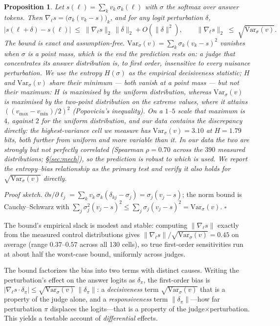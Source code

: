 \documentclass[11pt]{article}
\newtheorem{proposition}{Proposition}
\begin{document}
\begin{proposition}\label{prop:main}
Let $s(\ell)=\sum_k v_k\,\sigma_k(\ell)$ with $\sigma$ the softmax over answer tokens.
Then $\nabla_\ell s = \big(\sigma_k(v_k-s)\big)_k$, and for any logit perturbation
$\delta$,
\[
|s(\ell+\delta)-s(\ell)| \;\le\; \|\nabla_\ell s\|_2\,\|\delta\|_2 + O(\|\delta\|^2),
\qquad
\|\nabla_\ell s\|_2 \;\le\; \sqrt{\mathrm{Var}_\sigma(v)} .
\]
The bound is exact and assumption-free. $\mathrm{Var}_\sigma(v)=\sum_k\sigma_k(v_k-s)^2$
vanishes when $\sigma$ is a point mass, which is the end the prediction rests on: a judge
that concentrates its answer distribution is, to first order, insensitive to \emph{every}
nuisance perturbation. We use the entropy $H(\sigma)$ as the empirical decisiveness
statistic; $H$ and $\mathrm{Var}_\sigma(v)$ share their minimum --- both vanish at a point
mass --- but not their maximum: $H$ is maximised by the uniform distribution, whereas
$\mathrm{Var}_\sigma(v)$ is maximised by the two-point distribution on the extreme
values, where it attains $((v_{\max}-v_{\min})/2)^2$ (Popoviciu's inequality). On a
$1$--$5$ scale that maximum is $4$, against $2$ for the uniform distribution, and our
data contains the discrepancy directly: the highest-variance cell we measure has
$\mathrm{Var}_\sigma(v)=3.10$ at $H=1.79$ bits, both further from uniform and more
variable than it. In our data the two are
strongly but not perfectly correlated (Spearman $\rho=0.70$ across the
$390$ measured distributions; \S\ref{sec:mech}), so the prediction is robust to
which is used. We
report the entropy--bias relationship as the primary test and verify it also holds for
$\sqrt{\mathrm{Var}_\sigma(v)}$ directly.
\end{proposition}

\noindent\emph{Proof sketch.} $\partial s/\partial \ell_j=\sum_k v_k\,\sigma_k(\delta_{kj}-\sigma_j)
=\sigma_j(v_j-s)$; the norm bound is Cauchy--Schwarz with
$\sum_j\sigma_j^2(v_j-s)^2\le\sum_j\sigma_j(v_j-s)^2=\mathrm{Var}_\sigma(v)$. $\square$

\smallskip
\noindent The bound's empirical slack is modest and stable: computing
$\|\nabla_\ell s\|$ exactly from the measured control distributions gives
$\|\nabla_\ell s\|/\sqrt{\mathrm{Var}_\sigma(v)} = 0.45$ on average (range
$0.37$--$0.57$ across all 130 cells), so true first-order sensitivities run at about
half the worst-case bound, uniformly across judges.

\medskip
The bound factorizes the bias into two terms with distinct causes. Writing the
perturbation's effect on the answer logits as $\delta_\pi$, the first-order bias is
$|\nabla_\ell s\cdot\delta_\pi|\le\sqrt{\mathrm{Var}_\sigma(v)}\,\|\delta_\pi\|$: a
\emph{decisiveness} term $\sqrt{\mathrm{Var}_\sigma(v)}$ that is a property of the judge
alone, and a \emph{responsiveness} term $\|\delta_\pi\|$---how far perturbation $\pi$
displaces the logits---that is a property of the judge$\times$perturbation. This yields
a testable account of \emph{differential} effects.
\end{document}
